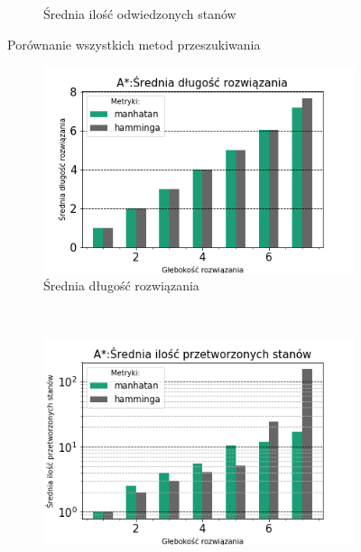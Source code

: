 \documentclass{classrep}
\begin{document}
\begin{figure}[H]
\begin{subfigure}[t]{0.45\textwidth}
        \caption{Średnia ilość odwiedzonych stanów}
        \label{ALL:visited}
    \end{subfigure}
    \caption{Porównanie wszystkich metod przeszukiwania}\label{col:all}
\end{figure}

\begin{figure}[H]
    \centering
    \begin{subfigure}[t]{0.45\textwidth}
        \includegraphics[width=\textwidth]{charts/ASTR_path_length.png}
        \caption{Średnia długość rozwiązania}
        \label{ASTR:path_length}
    \end{subfigure}
    ~ %
    \begin{subfigure}[t]{0.45\textwidth}
        \includegraphics[width=\textwidth]{charts/ASTR_processed.png}

\end{subfigure}
\end{figure}
\end{document}
